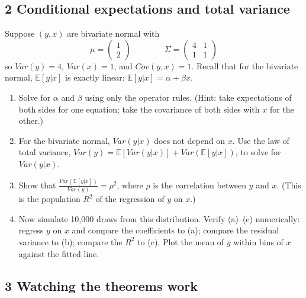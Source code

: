 \documentclass[11pt]{article}
\newcommand{\E}{\mathbb{E}}
\begin{document}
\subsection*{2 Conditional expectations and total variance}

Suppose $\left(y, x\right)$ are bivariate normal with
\[
\mu = \left(\begin{array}{c} 1 \\ 2 \end{array}\right) \qquad\qquad
\Sigma = \left(\begin{array}{cc} 4 & 1 \\ 1 & 1 \end{array}\right)
\]
so $Var(y) = 4$, $Var(x) = 1$, and $Cov(y,x)=1$. Recall that for the bivariate normal,
$\E\left[y|x\right]$ is exactly linear: $\E\left[y|x\right] = \alpha + \beta x$.
\begin{enumerate}[label=(\alph*)]
\item Solve for $\alpha$ and $\beta$ using only the operator rules.
(Hint: take expectations of both sides for one equation; take the covariance of both
sides with $x$ for the other.)
\item For the bivariate normal, $Var\left(y|x\right)$ does not depend on $x$. Use the law
of total variance,
$Var\left(y\right) = \E\left[Var\left(y|x\right)\right] + Var\left(\E\left[y|x\right]\right)$,
to solve for $Var\left(y|x\right)$.
\item Show that $\frac{Var\left(\E[y|x]\right)}{Var\left(y\right)} = \rho^{2}$, where
$\rho$ is the correlation between $y$ and $x$. (This is the population $R^{2}$ of the
regression of $y$ on $x$.)
\item Now simulate 10,000 draws from this distribution. Verify (a)--(c) numerically:
regress $y$ on $x$ and compare the coefficients to (a); compare the residual variance
to (b); compare the $R^{2}$ to (c). Plot the mean of $y$ within bins of $x$ against the
fitted line.
\end{enumerate}

\subsection*{3 Watching the theorems work}
\end{document}
